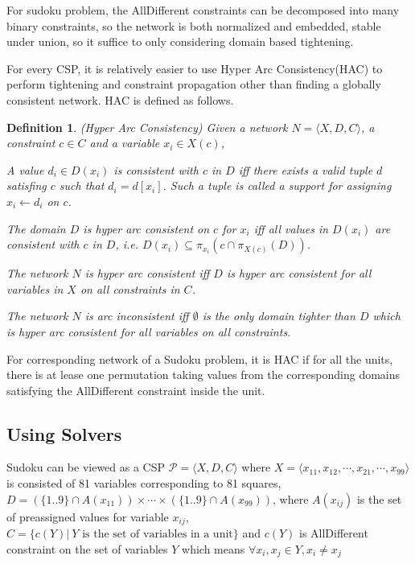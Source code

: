 \documentclass[a4paper, 12pt]{report}
\newtheorem{definition}{Definition}[subsection]
\begin{document}
            For sudoku problem, the AllDifferent constraints can be decomposed into many binary constraints, so the network is both normalized and embedded, stable under union, so it suffice to only considering domain based tightening.


            For every CSP, it is relatively easier to use Hyper Arc Consistency(HAC) to perform tightening and constraint propagation other than finding a globally consistent network. HAC is defined as follows.
            \begin{definition}
                (Hyper Arc Consistency) Given a network $N=\langle X,D,C\rangle$, a constraint $c\in C$ and a variable $x_i\in X(c)$,

                A value $d_i\in D(x_i)$ is consistent with $c$ in $D$ iff there exists a valid tuple $d$ satisfing $c$ such that $d_i=d[x_i]$. Such a tuple is called a support for assigning $x_i\gets d_i$ on $c$.

                The domain $D$ is hyper arc consistent on $c$ for $x_i$ iff all values in $D(x_i)$ are consistent with $c$ in $D$, i.e. $D(x_i)\subseteq \pi_{x_i} (c\cap \pi_{X(c)} (D))$.

                The network $N$ is hyper arc consistent iff $D$ is hyper arc consistent for all variables in $X$ on all constraints in $C$.

                The network $N$ is arc inconsistent iff $\emptyset$ is the only domain tighter than $D$ which is hyper arc consistent for all variables on all constraints.
            \end{definition}

            For corresponding network of a Sudoku problem, it is HAC if for all the units, there is at lease one permutation taking values from the corresponding domains satisfying the AllDifferent constraint inside the unit.

        \subsection {Using Solvers}
            Sudoku can be viewed as a CSP $\mathcal P=\langle X, D, C\rangle$ where $X=\langle x_{11}, x_{12}, \cdots, x_{21}, \cdots, x_{99}\rangle$ is consisted of 81 variables corresponding to 81 squares, $D=(\{1..9\}\cap A(x_{11}))\times\cdots\times(\{1..9\}\cap A(x_{99}))$, where $A(x_{ij})$ is the set of preassigned values for variable $x_{ij}$,  $C=\{c(Y)|\ Y \text{ is the set of variables in a unit}\}$ and $c(Y)$ is AllDifferent constraint on the set of variables $Y$ which means $\forall x_i,x_j\in Y,
            x_i\neq x_j$
\end{document}
